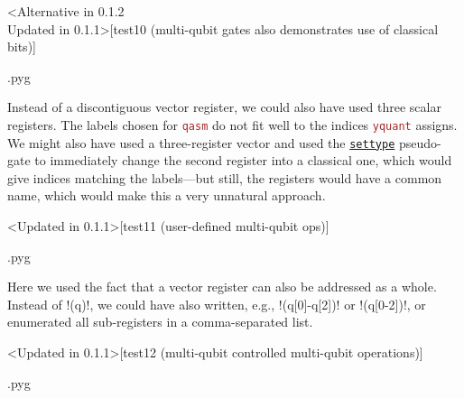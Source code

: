 \documentclass{scrartcl}
\makeatletter
\newenvironment{codeexample}{%
   \VerbatimEnvironment%
   \let\FVB@VerbatimOut\minted@FVB@VerbatimOut
   \let\FVE@VerbatimOut\minted@FVE@VerbatimOut
   \minted@configlang{tex}%
   \minted@fvset
   \begin{VerbatimOut}[codes={\catcode`\^^I=12},firstline,lastline]{\minted@jobname.pyg}%
}{
   \end{VerbatimOut}%
   \minted@langlinenoson%
   \savebox\codeexamplebox{ \minted@jobname.pyg}%
   \ifdim\wd\codeexamplebox>\dimexpr.5\linewidth-3mm\relax%
      \wd\codeexamplebox=.5\linewidth%
   \else%
      \wd\codeexamplebox=\dimexpr\wd\codeexamplebox+3mm\relax%
   \fi%
   \noindent\begin{minipage}{\wd\codeexamplebox}%
      \centering%
      \usebox\codeexamplebox%
   \end{minipage}%
   \begin{minipage}{\dimexpr\linewidth-\wd\codeexamplebox\relax}%
      \minted@pygmentize{\minted@lang}%
   \end{minipage}%
   \minted@langlinenosoff%
   \par%
}
\def\pkg#1{\textcolor{brown}{\texttt{#1}}}
\def\gate#1{\hyperref[gate:#1]{\texttt{#1}}}
\def\Yquant{\pkg{yquant}}
\makeatother
\begin{document}
         \begin{example}<Alternative in 0.1.2\\Updated in 0.1.1>[test10 (multi-qubit gates also demonstrates use of classical bits)]
            \begin{codeexample}
            \end{codeexample}
            Instead of a discontiguous vector register, we could also have used three scalar registers.
            The labels chosen for \pkg{qasm} do not fit well to the indices \Yquant{} assigns.
            We might also have used a three\hyp register vector and used the \gate{settype} pseudo\hyp gate to immediately change the second register into a classical one, which would give indices matching the labels---but still, the registers would have a common name, which would make this a very unnatural approach.
         \end{example}

         \clearpage
         \begin{example}<Updated in 0.1.1>[test11 (user-defined multi-qubit ops)]
            \begin{codeexample}
            \end{codeexample}
            Here we used the fact that a vector register can also be addressed as a whole.
            Instead of \tex!(q)!, we could have also written, e.g., \tex!(q[0]-q[2])! or \tex!(q[0-2])!, or enumerated all sub\hyp registers in a comma\hyp separated list.
         \end{example}

         \begin{example}<Updated in 0.1.1>[test12 (multi-qubit controlled multi-qubit operations)]
            \begin{codeexample}
            \end{codeexample}
         \end{example}
\end{document}
